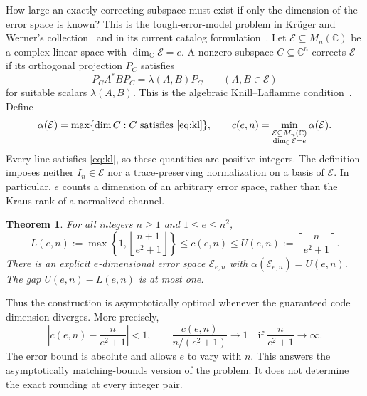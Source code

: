 \documentclass[11pt]{article}
\newcommand{\C}{\mathbb C}
\newcommand{\E}{\mathcal E}
\newtheorem{theorem}{Theorem}[section]
\theoremstyle{remark}
\numberwithin{equation}{section}
\begin{document}
How large an exactly correcting subspace must exist if only the dimension
of the error space is known? This is the tough-error-model problem in
Kr\"uger and Werner's collection~\cite[Problem~14]{KW05} and in its
current catalog formulation~\cite{QIQC}.
Let $\E\subseteq M_n(\C)$ be a complex linear space with
$\dim_{\C}\E=e$. A nonzero subspace $C\subseteq\C^n$ corrects $\E$ if
its orthogonal projection $P_C$ satisfies
\begin{equation}\label{eq:kl}
 P_C A^*B P_C=\lambda(A,B)P_C\qquad(A,B\in\E)
\end{equation}
for suitable scalars $\lambda(A,B)$. This is the algebraic
Knill--Laflamme condition~\cite{KL97,KLV00}. Define
\begin{equation}\label{eq:minimax}
 \alpha(\E)=\max\{\dim C:C\text{ satisfies \eqref{eq:kl}}\},
 \qquad
 c(e,n)=\min_{\substack{\E\subseteq M_n(\C)\\\dim_{\C}\E=e}}
 \alpha(\E).
\end{equation}
Every line satisfies \eqref{eq:kl}, so these quantities are positive
integers. The definition imposes neither $I_n\in\E$ nor a
trace-preserving normalization on a basis of $\E$. In particular, $e$
counts a dimension of an arbitrary error space, rather than the Kraus
rank of a normalized channel.

\begin{theorem}\label{thm:main}
For all integers $n\ge1$ and $1\le e\le n^2$,
\begin{equation}\label{eq:main}
 L(e,n):=\max\!\left\{1,\left\lfloor\frac{n+1}{e^2+1}\right\rfloor\right\}
 \le c(e,n)\le
 U(e,n):=\left\lceil\frac{n}{e^2+1}\right\rceil.
\end{equation}
There is an explicit $e$-dimensional error space $\E_{e,n}$ with
$\alpha(\E_{e,n})=U(e,n)$. The gap $U(e,n)-L(e,n)$ is at most one.
\end{theorem}

Thus the construction is asymptotically optimal whenever the guaranteed
code dimension diverges. More precisely,
\begin{equation}\label{eq:asymptotic}
 \left|c(e,n)-\frac{n}{e^2+1}\right|<1,
 \qquad
 \frac{c(e,n)}{n/(e^2+1)}\longrightarrow1
 \quad\text{if }\frac{n}{e^2+1}\longrightarrow\infty.
\end{equation}
The error bound is absolute and allows $e$ to vary with $n$. This answers
the asymptotically matching-bounds version of the problem. It does not
determine the exact rounding at every integer pair.
\end{document}
